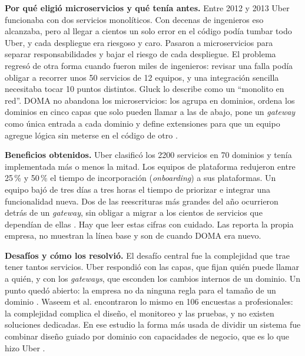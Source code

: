 \documentclass[11pt,a4paper]{article}
\newcommand{\apartado}[1]{\par\vspace{3pt}\noindent\textbf{#1}\quad}
\begin{document}
\apartado{Por qué eligió microservicios y qué tenía antes.}
Entre 2012 y 2013 Uber funcionaba con dos servicios monolíticos. Con decenas de ingenieros eso alcanzaba, pero al llegar a cientos un solo error en el código podía tumbar todo Uber, y cada despliegue era riesgoso y caro. Pasaron a microservicios para separar responsabilidades y bajar el riesgo de cada despliegue. El problema regresó de otra forma cuando fueron miles de ingenieros: revisar una falla podía obligar a recorrer unos 50 servicios de 12 equipos, y una integración sencilla necesitaba tocar 10 puntos distintos. Gluck lo describe como un \enquote{monolito en red}. DOMA no abandona los microservicios: los agrupa en dominios, ordena los dominios en cinco capas que solo pueden llamar a las de abajo, pone un \emph{gateway} como única entrada a cada dominio y define extensiones para que un equipo agregue lógica sin meterse en el código de otro \cite{gluck2020}.

\apartado{Beneficios obtenidos.}
Uber clasificó los 2200 servicios en 70 dominios y tenía implementada más o menos la mitad. Los equipos de plataforma redujeron entre 25\,\% y 50\,\% el tiempo de incorporación (\emph{onboarding}) a sus plataformas. Un equipo bajó de tres días a tres horas el tiempo de priorizar e integrar una funcionalidad nueva. Dos de las reescrituras más grandes del año ocurrieron detrás de un \emph{gateway}, sin obligar a migrar a los cientos de servicios que dependían de ellas \cite{gluck2020}. Hay que leer estas cifras con cuidado. Las reporta la propia empresa, no muestran la línea base y son de cuando DOMA era nuevo.

\apartado{Desafíos y cómo los resolvió.}
El desafío central fue la complejidad que trae tener tantos servicios. Uber respondió con las capas, que fijan quién puede llamar a quién, y con los \emph{gateways}, que esconden los cambios internos de un dominio. Un punto quedó abierto: la empresa no da ninguna regla para el tamaño de un dominio \cite{gluck2020}. Waseem et al. encontraron lo mismo en 106 encuestas a profesionales: la complejidad complica el diseño, el monitoreo y las pruebas, y no existen soluciones dedicadas. En ese estudio la forma más usada de dividir un sistema fue combinar diseño guiado por dominio con capacidades de negocio, que es lo que hizo Uber \cite{waseem2021}.
\end{document}
